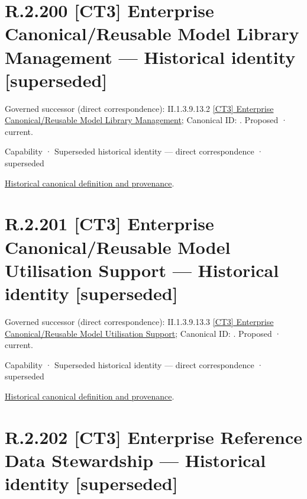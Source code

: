 \section*{R.2.200 [CT3] Enterprise Canonical/Reusable Model Library Management — Historical identity [superseded]}
\label{navigation:R.2.200}

{\small Governed successor (direct correspondence): II.1.3.9.13.2 \hyperref[element:76943b4b68644c4dac1368fce8bb20d9]{[CT3] Enterprise Canonical/Reusable Model Library Management}; Canonical ID: \texttt{}. Proposed · current.}\par
\label{element:f5eccd4f65df49bba98104e5abfa5e19}
{\small Capability · Superseded historical identity — direct correspondence · superseded}\par
\href{../../../../continuum/strategy/capability/f5eccd4f65df49bba98104e5abfa5e19.md}{Historical canonical definition and provenance}.\par
\section*{R.2.201 [CT3] Enterprise Canonical/Reusable Model Utilisation Support — Historical identity [superseded]}
\label{navigation:R.2.201}

{\small Governed successor (direct correspondence): II.1.3.9.13.3 \hyperref[element:5744cb9d86494064af87afb3cbf2cf97]{[CT3] Enterprise Canonical/Reusable Model Utilisation Support}; Canonical ID: \texttt{}. Proposed · current.}\par
\label{element:7ae95677a00346f18a0ba01522a20153}
{\small Capability · Superseded historical identity — direct correspondence · superseded}\par
\href{../../../../continuum/strategy/capability/7ae95677a00346f18a0ba01522a20153.md}{Historical canonical definition and provenance}.\par
\section*{R.2.202 [CT3] Enterprise Reference Data Stewardship — Historical identity [superseded]}
\label{navigation:R.2.202}

